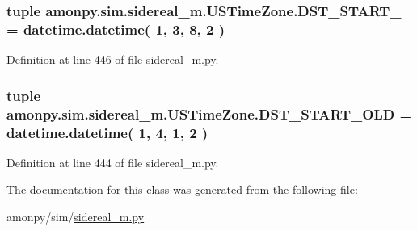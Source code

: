 \hypertarget{classamonpy_1_1sim_1_1sidereal__m_1_1_u_s_time_zone_a175d1e09720df8704393ae8c0a8c4bbd}{
\subsubsection[{D\-S\-T\-\_\-\-S\-T\-A\-R\-T\-\_\-2007}]{\setlength{\rightskip}{0pt plus 5cm}tuple amonpy.\-sim.\-sidereal\-\_\-m.\-U\-S\-Time\-Zone.\-D\-S\-T\-\_\-\-S\-T\-A\-R\-T\-\_ = datetime.\-datetime( 1, 3, 8, 2 )\hspace{0.3cm}{\ttfamily [static]}}}\label{classamonpy_1_1sim_1_1sidereal__m_1_1_u_s_time_zone_a175d1e09720df8704393ae8c0a8c4bbd}


Definition at line 446 of file sidereal\-\_\-m.\-py.

\hypertarget{classamonpy_1_1sim_1_1sidereal__m_1_1_u_s_time_zone_a6a44aff78ec6d41c874c5a47faad7bbe}{
\subsubsection[{D\-S\-T\-\_\-\-S\-T\-A\-R\-T\-\_\-\-O\-L\-D}]{\setlength{\rightskip}{0pt plus 5cm}tuple amonpy.\-sim.\-sidereal\-\_\-m.\-U\-S\-Time\-Zone.\-D\-S\-T\-\_\-\-S\-T\-A\-R\-T\-\_\-\-O\-L\-D = datetime.\-datetime( 1, 4, 1, 2 )\hspace{0.3cm}{\ttfamily [static]}}}\label{classamonpy_1_1sim_1_1sidereal__m_1_1_u_s_time_zone_a6a44aff78ec6d41c874c5a47faad7bbe}


Definition at line 444 of file sidereal\-\_\-m.\-py.



The documentation for this class was generated from the following file\-:\begin{DoxyCompactItemize}
\item 
amonpy/sim/\hyperlink{sidereal__m_8py}{sidereal\-\_\-m.\-py}\end{DoxyCompactItemize}
